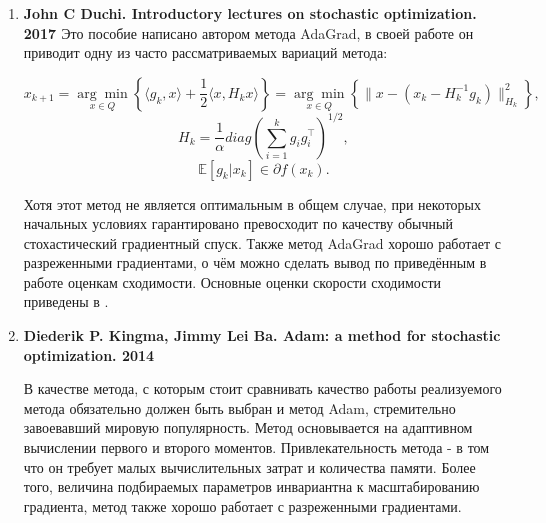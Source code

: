\documentclass[]{scrartcl}
\begin{document}
\begin{enumerate}
	\item \textbf{John C Duchi. Introductory lectures on stochastic optimization. 2017 \cite{duchi2017introductory}}
Это пособие написано автором метода AdaGrad, в своей работе он приводит одну из часто рассматриваемых вариаций метода: 

\begin{equation}
x_{k+1} = \underset{x\in Q}{\arg\!\min}\left\{\langle g_k,x\rangle + \frac{1}{2}\langle x, H_k x\rangle \right\} = \underset{x\in Q}{\arg\!\min}\left\{\|x-(x_k-H^{-1}_k g_k)\|^2_{H_k}\right\},
\end{equation}
\begin{equation}
H_k = \frac{1}{\alpha}diag\left(\sum\limits_{i=1}^kg_i g_i^{\top}\right)^{1/2},
\end{equation}
$$\mathbb{E}[g_k|x_k] \in \partial f(x_k).$$

Хотя этот метод не является оптимальным в общем случае, при некоторых начальных условиях гарантировано превосходит по качеству обычный стохастический градиентный спуск. Также метод AdaGrad хорошо работает с разреженными градиентами, о чём можно сделать вывод по приведённым в работе оценкам сходимости. Основные оценки скорости сходимости приведены в \cite{duchi2017introductory}. 

	\item \textbf{Diederik P. Kingma, Jimmy Lei Ba. Adam: a method for stochastic optimization. 2014 \cite{kingma2014adam}}

В качестве метода, с которым стоит сравнивать качество работы реализуемого метода обязательно должен быть выбран и метод Adam, стремительно завоевавший мировую популярность. Метод основывается на адаптивном вычислении первого и второго моментов. Привлекательность метода - в том что он требует малых вычислительных затрат и количества памяти. Более того, величина подбираемых параметров инвариантна к масштабированию градиента, метод также хорошо работает с разреженными градиентами.


\end{enumerate}
\end{document}
